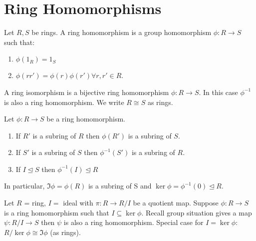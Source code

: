 \section{Ring Homomorphisms}

\begin{prop-defn}[Homomorphism]
Let \(R, S\) be rings. A ring homomorphism is a group homomorphism \(\phi: R \to S\) such that:
\begin{enumerate}
    \item \(\phi(1_R) = 1_S\)
    \item \(\phi(rr') = \phi(r)\phi(r') \forall r, r' \in R\).
\end{enumerate}
\end{prop-defn}

\begin{definition}[Isomorphism]
    A ring isomorphism is a bijective ring homomorphism \(\phi: R \to S\). In this case \(\phi^{-1}\) is also a ring homomorphism. We write \(R \cong S\) as rings.
\end{definition}

\begin{proposition}
    Let \(\phi: R \to S\) be a ring homomorphism.
    \begin{enumerate}
        \item If \(R'\) is a subring of \(R\) then \(\phi(R')\) is a subring of \(S\).
        \item If \(S'\) is a subring of \(S\) then \(\phi^{-1}(S')\) is a subring of \(R\).
        \item If \(I \trianglelefteq S\) then \(\phi^{-1}(I) \trianglelefteq R\)
    \end{enumerate}
\end{proposition}

\begin{corollary}
    In particular, \(\Im \phi = \phi(R)\) is a subring of S and \(\ker \phi = \phi^{-1}(0) \trianglelefteq R\).
\end{corollary}

\begin{theorem}
    Let \(R \) = ring, \(I = \) ideal with \(\pi: R \to R / I\) be a quotient map. Suppose \(\phi: R \to S\) is a ring homomorphism such that \(I \subseteq \ker \phi\). Recall group situation gives a map \(\psi: R / I \to S\) then \(\psi\) is also a ring homomorphism. Special case for \(I = \ker \phi\): \(R / \ker\phi \cong \Im \phi\) (as rings).
\end{theorem}